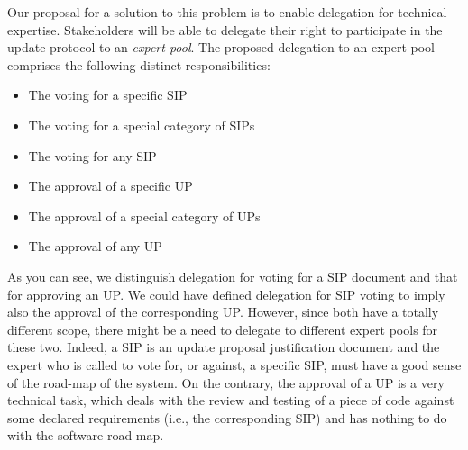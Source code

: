Our proposal for a solution to this problem is to enable delegation for
technical expertise. Stakeholders will be able to delegate their right to
participate in the update protocol to an \emph{expert pool}. The proposed
delegation to an expert pool comprises the following distinct responsibilities:
\begin{itemize}
\item The voting for a specific SIP
\item The voting for a special category of SIPs
\item The voting for any SIP
\item The approval of a specific UP
\item The approval of a special category of UPs
\item The approval of any UP
\end{itemize}
As you can see, we distinguish delegation for voting for a SIP document and that
for approving an UP. We could have defined delegation for SIP voting to imply
also the approval of the corresponding UP. However, since both have a totally
different scope, there might be a need to delegate to different expert pools for
these two. Indeed, a SIP is an update proposal justification document and the
expert who is called to vote for, or against, a specific SIP, must have a good
sense of the road-map of the system. On the contrary, the approval of a UP is a
very technical task, which deals with the review and testing of a piece of code
against some declared requirements (i.e., the corresponding SIP) and has nothing
to do with the software road-map.

%

